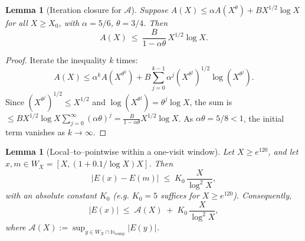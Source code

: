 \documentclass[11pt]{article}
\theoremstyle{plain}
\newtheorem{lemma}[theorem]{Lemma}
\theoremstyle{definition}
\theoremstyle{remark}
\begin{document}
\begin{lemma}[Iteration closure for $\mathcal A$]\label{lem:aiterate}
Suppose $A(X)\le \alpha A(X^\theta)+B X^{1/2}\log X$ for all $X\ge X_0$, with $\alpha=5/6$, $\theta=3/4$. Then
\[
A(X)\ \le\ \frac{B}{1-\alpha\theta}\,X^{1/2}\log X.
\]
\end{lemma}
\begin{proof}
Iterate the inequality $k$ times:
\[
A(X)\le \alpha^k A(X^{\theta^k})+B\sum_{j=0}^{k-1}\alpha^j(X^{\theta^j})^{1/2}\log(X^{\theta^j}).
\]
Since $(X^{\theta^j})^{1/2}\le X^{1/2}$ and $\log(X^{\theta^j})=\theta^j\log X$, the sum is $\le B X^{1/2}\log X\sum_{j=0}^\infty (\alpha\theta)^j = \tfrac{B}{1-\alpha\theta}X^{1/2}\log X$. As $\alpha\theta=5/8<1$, the initial term vanishes as $k\to\infty$.
\end{proof}

\begin{lemma}[Local--to--pointwise within a one-visit window]\label{lem:local2point-clean}
Let $X\ge e^{120}$, and let $x,m\in W_X=[X,(1+0.1/\log X)X]$. Then
\begin{equation}\label{eq:local2point-diff}
|E(x)-E(m)| \;\le\; K_0\,\frac{X}{\log^2 X},
\end{equation}
with an absolute constant $K_0$ (e.g. $K_0=5$ suffices for $X\ge e^{120}$). Consequently,
\begin{equation}\label{eq:local2point-main}
|E(x)| \;\le\; \mathcal A(X) \;+\; K_0\,\frac{X}{\log^2 X},
\end{equation}
where $\mathcal A(X):=\sup_{y\in W_X\cap\mathbb N_{\mathrm{comp}}}|E(y)|$.
\end{lemma}
\end{document}

